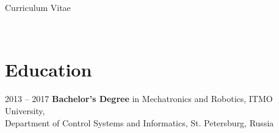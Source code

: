 \documentclass{ncv}
\begin{document}
\begin{center}
    {\Huge Curriculum Vitae}
\end{center}

\vspace{1cm}

\header

\ 

\section{Education}
\begin{two_col_entry_list}
	\entry
		{2013 -- 2017}
		{\textbf{Bachelor's Degree} in Mechatronics and Robotics, ITMO University, \\ Department of Control Systems and Informatics, St. Petersburg, Russia}
\end{two_col_entry_list}

\ 
\end{document}
